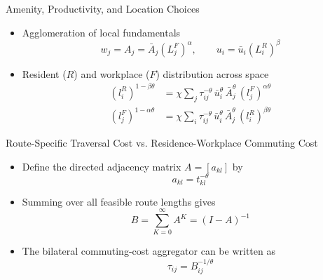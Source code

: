 \documentclass[11pt,aspectratio=169]{beamer}
\begin{document}
\begin{frame}{Amenity, Productivity, and Location Choices}
\begin{itemize}
  \item Agglomeration of local fundamentals
  \vspace{-0.5em}\begin{equation}\label{eq:agglom}
    w_j = A_j = \bar A_j\left(L_j^F\right)^\alpha, \qquad u_i=\bar u_i\left(L_i^R\right)^\beta
  \end{equation}
  \item Resident ($R$) and workplace ($F$) distribution across space
  \begin{align}
  (l_i^R)^{1-\beta\theta} & = \chi \sum_j\tau_{ij}^{-\theta}\,\bar u_i^{\theta}\,\bar A_j^{\theta}\,(l_j^F)^{\alpha\theta} \label{eq:clear1} \\
  (l_j^F)^{1-\alpha\theta} & = \chi \sum_i\tau_{ij}^{-\theta}\,\bar u_i^{\theta}\,\bar A_j^{\theta}\,(l_i^R)^{\beta\theta} \label{eq:clear2}
  \end{align}
\end{itemize}
\end{frame}

\begin{frame}{Route-Specific Traversal Cost vs. Residence-Workplace Commuting Cost}
\begin{itemize}
  \item Define the directed adjacency matrix $A=[a_{kl}]$ by
  \vspace{-0.5em}\begin{equation}
    a_{kl} = t_{kl}^{-\theta}
  \end{equation}
  \item Summing over all feasible route lengths gives
  \vspace{-0.5em}\begin{equation}
    B = \sum_{K=0}^{\infty}A^K = (I-A)^{-1}
  \end{equation}
  \item The bilateral commuting-cost aggregator can be written as
  \vspace{-0.5em}\begin{equation}\label{eq:inverse}
    \tau_{ij} = B_{ij}^{-1/\theta}
  \end{equation}
\end{itemize}
\end{frame}
\end{document}
